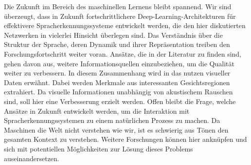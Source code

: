 Die Zukunft im Bereich des maschinellen Lernens bleibt spannend. Wir sind überzeugt, dass in Zukunft fortschrittlichere Deep-Learning-Architekturen für effektivere Spracherkennungssysteme entwickelt werden, die den hier diskutierten Netzwerken in vielerlei Hinsicht überlegen sind. Das Verständnis über die Struktur der Sprache, deren Dynamik und ihrer Repräsentation treiben den Forschungsfortschritt weiter voran. Ansätze, die in der Literatur zu finden sind, gehen davon aus, weitere Informationsquellen einzubeziehen, um die Qualität weiter zu verbessern. In diesem Zusammenhang wird in {\cite{Yu.2014}} das nutzen visueller Daten erwähnt. Dabei werden Merkmale aus interessanten Gesichtsregionen extrahiert. Da visuelle Informationen unabhängig von akustischem Rauschen sind, soll hier eine Verbesserung erzielt werden. Offen bleibt die Frage, welche Ansätze in Zukunft entwickelt werden, um die Interaktion mit Spracherkennungssystemen zu einem natürlichen Prozess zu machen. Da Maschinen die Welt nicht verstehen wie wir, ist es schwierig aus Tönen den gesamten Kontext zu verstehen. Weitere Forschungen können hier anknüpfen und sich mit potentiellen Möglichkeiten zur Lösung dieses Problems auseinandersetzen.

\ifCLASSOPTIONcaptionsoff
  \newpage
\fi